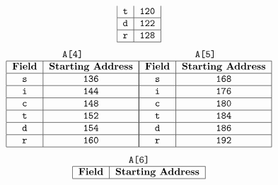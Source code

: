 \documentclass[9pt]{article}
\begin{document}
\begin{enumerate}
\begin{enumerate}
$$\begin{tabular}{@{}|c|c|@{}}
                     \verb|t| & \verb|120| \\ \hline
                     \verb|d| & \verb|122| \\ \hline
                     \verb|r| & \verb|128| \\ \hline
                  \end{tabular}
               $$
               $$
                  \begin{tabular}{@{}|c|c|@{}}
                     \multicolumn{2}{c}{\texttt{A[4]}} \\ \hline
                     \textbf{Field} & \textbf{Starting Address} \\ \hline
                     \verb|s| & \verb|136| \\ \hline
                     \verb|i| & \verb|144| \\ \hline
                     \verb|c| & \verb|148| \\ \hline
                     \verb|t| & \verb|152| \\ \hline
                     \verb|d| & \verb|154| \\ \hline
                     \verb|r| & \verb|160| \\ \hline
                  \end{tabular}
                  \begin{tabular}{@{}|c|c|@{}}
                     \multicolumn{2}{c}{\texttt{A[5]}} \\ \hline
                     \textbf{Field} & \textbf{Starting Address} \\ \hline
                     \verb|s| & \verb|168| \\ \hline
                     \verb|i| & \verb|176| \\ \hline
                     \verb|c| & \verb|180| \\ \hline
                     \verb|t| & \verb|184| \\ \hline
                     \verb|d| & \verb|186| \\ \hline
                     \verb|r| & \verb|192| \\ \hline
                  \end{tabular}
               $$
               $$
                  \begin{tabular}{@{}|c|c|@{}}
                     \multicolumn{2}{c}{\texttt{A[6]}} \\ \hline
                     \textbf{Field} & \textbf{Starting Address} \\ \hline

\end{tabular}$$
\end{enumerate}
\end{enumerate}
\end{document}
